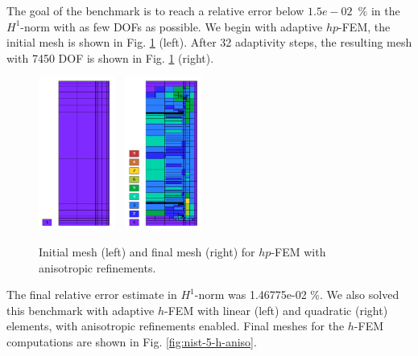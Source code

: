 The goal of the benchmark is to reach a relative error below
$1.5e-02$~\% in the $H^1$-norm with as few DOFs as possible.
We begin with adaptive $hp$-FEM,
the initial mesh is shown in Fig. \ref{fig:nist-5-hp-aniso} (left).
After 32 adaptivity steps, the resulting mesh with 7450 DOF is shown
in Fig. \ref{fig:nist-5-hp-aniso} (right).

\begin{figure}[!ht]
\centering
\includegraphics[height=5cm]{nist/nist-5/mesh_hp_aniso_init.png}\ \
\includegraphics[height=5cm]{nist/nist-5/mesh_hp_aniso.png}
\vspace{-2mm}
\caption{Initial mesh (left) and final mesh (right) for $hp$-FEM with anisotropic refinements.}
\label{fig:nist-5-hp-aniso}
\end{figure}

The final relative error estimate in $H^1$-norm was 1.46775e-02 \%.
We also solved this benchmark with adaptive $h$-FEM
with linear (left) and quadratic (right)
elements, with anisotropic refinements enabled.
Final meshes for the $h$-FEM computations are shown
in Fig. \ref{fig:nist-5-h-aniso}.

